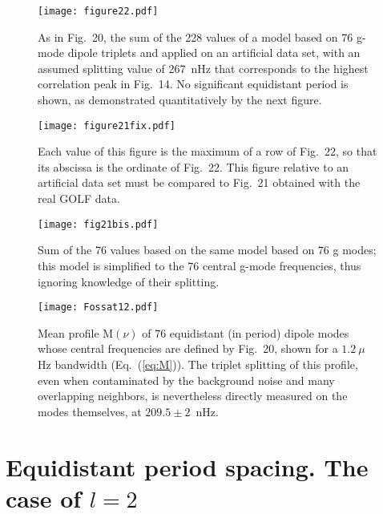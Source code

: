 \documentclass[bibyear]{aa}
\begin{document}
\begin{figure}
\texttt{[image: figure22.pdf]}
\caption{As in Fig.~20, the sum of the 228 values of  a model based on 76 g-mode dipole triplets and applied on an artificial data set, with an assumed splitting value of 267~nHz that corresponds to the highest correlation peak in Fig.~14. No significant equidistant period is shown, as demonstrated quantitatively by the next figure.}
\label{fig:C1_simu}
\end{figure} 

\begin{figure}
\texttt{[image: figure21fix.pdf]}
\caption{Each value of this figure is the maximum of a row of Fig.~22, so that its abscissa is the ordinate of Fig.~22.  This figure relative to an artificial data set must be compared to Fig.~21 obtained with the real GOLF data.}
\label{fig:max_row_C1_simu}
\end{figure} 




\begin{figure}
\centering
\texttt{[image: fig21bis.pdf]}
\caption{   Sum of the 76 values based on the same model based on 76 g modes; this model is simplified to the 76  central g-mode frequencies, thus ignoring knowledge of their splitting.}
\label{fig:sum_central}
\end{figure} 


\begin{figure}
\centering
\texttt{[image: Fossat12.pdf]}
\caption{Mean profile $\mathrm{M}(\nu)$ of 76  equidistant (in period) dipole modes whose central frequencies are defined by Fig.~20, shown for a $1.2\ \mu$Hz bandwidth (Eq.~(\ref{eq:M})). The triplet splitting of this profile, even when contaminated by the background noise and many overlapping neighbors, is nevertheless directly measured on the modes themselves, at $209.5\pm 2$~nHz.}
\label{fig:M}
\end{figure} 



\section{Equidistant period spacing. The case of $l=2$ }
\end{document}
